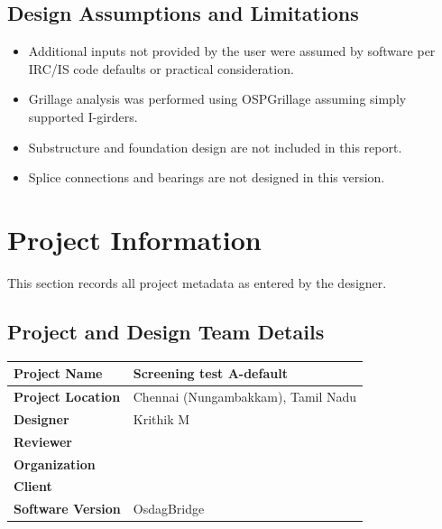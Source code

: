 \documentclass[12pt,a4paper]{report}
\numberwithin{table}{chapter}
\numberwithin{figure}{chapter}
\begin{document}
\section*{Design Assumptions and Limitations}
\label{sec:assumptions}

\begin{itemize}
\item Additional inputs not provided by the user were assumed by software per IRC/IS code defaults or practical consideration.
\item Grillage analysis was performed using OSPGrillage assuming simply supported I-girders.
\item Substructure and foundation design are not included in this report.
\item Splice connections and bearings are not designed in this version.
\end{itemize}

\titleformat{\chapter}[block]{\normalfont\Large\bfseries\centering}{\thechapter}{1em}{}
\titlespacing*{\chapter}{0pt}{-30pt}{10pt}


\chapter{Project Information}

This section records all project metadata as entered by the designer.

\section{Project and Design Team Details}
\label{sec:project-details}

\begin{tabular}{|L{5.5cm}|L{8.5cm}|}
\hline
\textbf{Project Name} & Screening test A-default \\
\hline
\textbf{Project Location} & Chennai (Nungambakkam), Tamil Nadu \\
\hline
\textbf{Designer} & Krithik M \\
\hline
\textbf{Reviewer} &  \\
\hline
\textbf{Organization} &  \\
\hline
\textbf{Client} &  \\
\hline
\textbf{Software Version} & OsdagBridge \\
\hline
\end{tabular}
\end{document}
